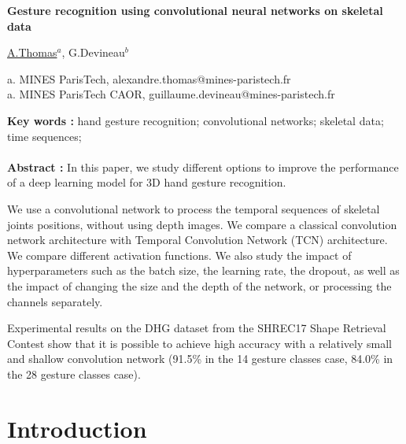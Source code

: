 \documentclass{article}
\begin{document}
\begin{center}
    \begin{Large}\textbf{Gesture recognition using convolutional neural networks on skeletal data}\end{Large}

    \vspace{1cm}
    \begin{large}\underline{A.Thomas$^a$}, G.Devineau$^b$\end{large}

    \vspace{0.5cm}
    a. MINES ParisTech, alexandre.thomas@mines-paristech.fr\\
    a. MINES ParisTech CAOR, guillaume.devineau@mines-paristech.fr\\
    \vspace{1cm}
\end{center}

\noindent\textbf{Key words :} hand gesture recognition; convolutional networks; skeletal data; time sequences;
\\
\\
\textbf{Abstract : }
In this paper, we study different options to improve the performance of a deep learning model for 3D hand gesture recognition.
\par
We use a convolutional network to process the temporal sequences of skeletal joints positions, without using depth images. We compare a classical convolution network architecture with Temporal Convolution Network (TCN) architecture. We compare different activation functions.
We also study the impact of hyperparameters such as the batch size, the learning rate, the dropout, as well as the impact of changing the size and the depth of the network, or processing the channels separately.
\par
Experimental results on the DHG dataset from the SHREC17 Shape Retrieval Contest show that it is possible to achieve high accuracy with a relatively small and shallow convolution network (91.5\% in the 14 gesture classes case, 84.0\% in the 28 gesture classes case).


\section{Introduction}
\end{document}
